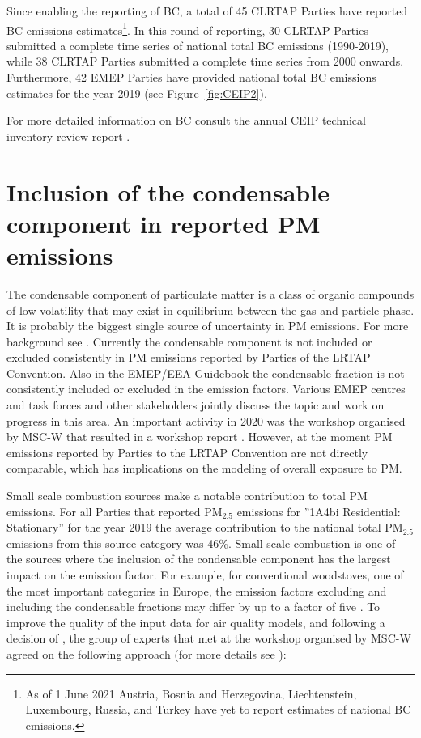 Since enabling the reporting of BC, a total of 45 CLRTAP Parties have reported BC emissions estimates\footnote{ As of 1 June 2021  Austria, Bosnia and Herzegovina, Liechtenstein, Luxembourg, Russia, and Turkey have yet to report estimates of national BC emissions.}. In this round of reporting, 30 CLRTAP Parties submitted a complete time series of national total BC emissions (1990-2019), while 38 CLRTAP Parties submitted a complete time series from 2000 onwards. Furthermore, 42 EMEP Parties have provided national total BC emissions estimates for the year 2019 (see Figure~\ref{fig:CEIP2}).

For more detailed information on BC consult the annual CEIP technical inventory review report \citep{CEIP2020}.


\section{Inclusion of the condensable component in reported PM emissions}
\label{sec:EmisSVOC}

The condensable component of particulate matter is a class of organic compounds of low volatility that may exist in equilibrium between the gas and particle phase. It is probably the biggest single source of uncertainty in PM emissions. For more background see \citet{CONDws2020}.
Currently the condensable component is not included or excluded consistently in PM emissions reported by Parties
of the LRTAP Convention. Also in the EMEP/EEA Guidebook \citep{EmisInvGuide2019} the condensable fraction is not consistently included or
excluded in the emission factors. Various EMEP centres and task forces and other stakeholders jointly discuss the topic and work on progress in this area. An important activity in 2020 was the workshop organised by MSC-W that resulted in a workshop report \citep{CONDws2020}. However, at the moment PM emissions reported by Parties to the LRTAP Convention are not directly
comparable, which has implications on the modeling of overall exposure to PM.

Small scale combustion sources make a notable contribution to total PM emissions. For all Parties that reported PM$_{2.5}$ emissions for ''1A4bi Residential: Stationary'' for the year 2019 the average contribution to the national total PM$_{2.5}$ emissions from this source category was 46\%. Small-scale combustion is one of the sources where the inclusion of the condensable component has the largest impact on the emission factor. For example, for conventional woodstoves, one of the most important categories in Europe, the emission factors excluding and including the condensable fractions may differ by up to a factor of five \citep{DeniervanderGon2015}.
To improve the quality of the input data for air quality models, and following a decision of \citet{EMEPBureaux2020}, the group of experts that met at the workshop organised by MSC-W agreed on the following approach (for more details see \citet{CONDws2020}): 

